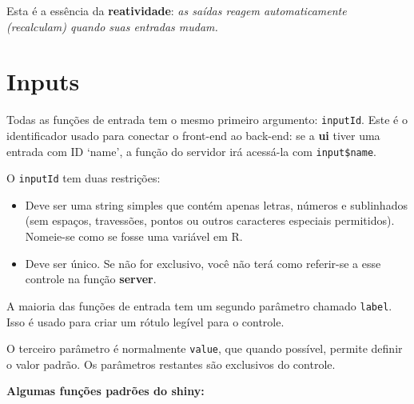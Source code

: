 \documentclass[
]{book}
\begin{document}
Esta é a essência da \textbf{reatividade}: \emph{as saídas reagem automaticamente (recalculam) quando suas entradas mudam.}

\hypertarget{inputs}{%
\section{\texorpdfstring{\textbf{Inputs}}{Inputs}}\label{inputs}}

Todas as funções de entrada tem o mesmo primeiro argumento: \texttt{inputId}. Este é o identificador usado para conectar o front-end ao back-end: se a \textbf{ui} tiver uma entrada com ID `name', a função do servidor irá acessá-la com \texttt{input\$name}.

O \texttt{inputId} tem duas restrições:

\begin{itemize}
\item
  Deve ser uma string simples que contém apenas letras, números e sublinhados (sem espaços, travessões, pontos ou outros caracteres especiais permitidos). Nomeie-se como se fosse uma variável em R.
\item
  Deve ser único. Se não for exclusivo, você não terá como referir-se a esse controle na função \textbf{server}.
\end{itemize}

A maioria das funções de entrada tem um segundo parâmetro chamado \texttt{label}. Isso é usado para criar um rótulo legível para o controle.

O terceiro parâmetro é normalmente \texttt{value}, que quando possível, permite definir o valor padrão. Os parâmetros restantes são exclusivos do controle.

\textbf{Algumas funções padrões do shiny:}
\end{document}
